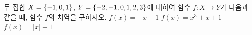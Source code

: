 두 집합 $X=\{-1{,}\mkern3mu\mathopen{}0{,}\mkern3mu\mathopen{}1\}$, $Y=\{-2{,}\mkern3mu\mathopen{}-1{,}\mkern3mu\mathopen{}0{,}\mkern3mu\mathopen{}1{,}\mkern3mu\mathopen{}2{,}\mkern3mu\mathopen{}3\}$에 대하여 함수 $f:X\longrightarrow Y$가 다음과 같을 때, 함수 $f$의 치역을 구하시오.
 $f(x)=-x+1$
 $f(x)=x^3+x+1$
 $f(x)=|x|-1$
